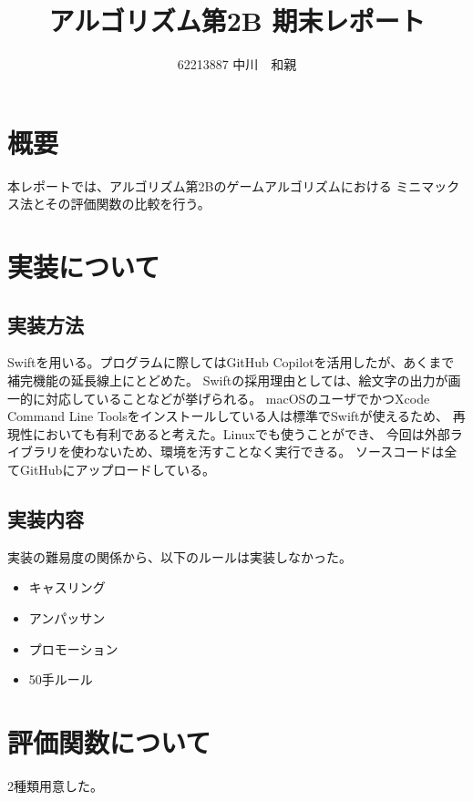 \documentclass[12pt, a4paper, uplatex]{jsarticle}
\title{アルゴリズム第2B 期末レポート}
\author{62213887 中川　和親}
\begin{document}
\maketitle

\section{概要}
本レポートでは、アルゴリズム第2Bのゲームアルゴリズムにおける
ミニマックス法とその評価関数の比較を行う。

\section{実装について}
\subsection{実装方法}
Swiftを用いる。プログラムに際してはGitHub Copilotを活用したが、あくまで補完機能の延長線上にとどめた。
Swiftの採用理由としては、絵文字の出力が画一的に対応していることなどが挙げられる。
macOSのユーザでかつXcode Command Line Toolsをインストールしている人は標準でSwiftが使えるため、
再現性においても有利であると考えた。Linuxでも使うことができ、
今回は外部ライブラリを使わないため、環境を汚すことなく実行できる。
ソースコードは全てGitHubにアップロードしている。

\subsection{実装内容}
実装の難易度の関係から、以下のルールは実装しなかった。
\begin{itemize}
  \item キャスリング
  \item アンパッサン
  \item プロモーション
  \item 50手ルール
\end{itemize}

\section{評価関数について}
2種類用意した。
\end{document}
